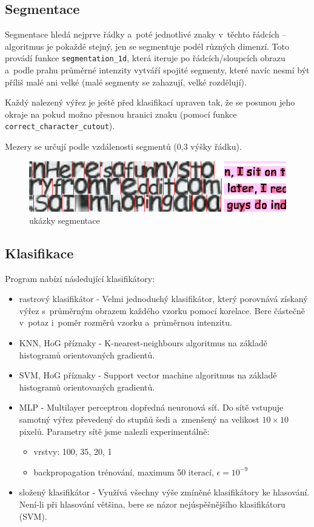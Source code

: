 \documentclass[12pt]{article}
\begin{document}
\subsection{Segmentace}

Segmentace hledá nejprve řádky a~poté jednotlivé znaky v~těchto řádcích -- algoritmus je pokaždé stejný, jen
se segmentuje podél různých dimenzí. Toto provádí funkce {\tt segmentation\_1d}, která iteruje po
řádcích/sloupcích obrazu a~podle prahu průměrné intenzity vytváří spojité segmenty, které navíc nesmí být příliš malé
ani velké (malé segmenty se zahazují, velké rozdělují).

Každý nalezený výřez je ještě před klasifikací upraven tak, že se posunou jeho okraje na pokud možno přesnou hranici znaku
(pomocí funkce {\tt correct\_character\_cutout}).

Mezery se určují podle vzdálenosti segmentů (0,3 výšky řádku).

\begin{figure}[htb]
  \centering
  \includegraphics[width=13.5cm,keepaspectratio]{cutouts.png}
  \caption{ukázky segmentace}
\end{figure}

\subsection{Klasifikace}

Program nabízí následující klasifikátory:

\begin{itemize}
  \item rastrový klasifikátor \cite{ocr} - Velmi jednoduchý klasifikátor, který porovnává získaný výřez s~průměrným obrazem každého vzorku pomocí korelace. Bere částečně v~potaz i~poměr rozměrů vzorku a~průměrnou intenzitu.
  \item KNN, HoG příznaky - K-nearest-neighbours algoritmus na základě histogramů orientovaných gradientů.
  \item SVM, HoG příznaky - Support vector machine algoritmus na základě histogramů orientovaných gradientů.
  \item MLP - Multilayer perceptron dopředná neuronová síť. Do sítě vstupuje samotný výřez převedený do stupňů šedi a~zmenšený na velikost $10 \times 10$ pixelů. Parametry sítě jsme nalezli experimentálně: 
    \begin{itemize}
      \item vrstvy: 100, 35, 20, 1
      \item backpropagation trénování, maximum 50 iterací, $\epsilon = 10^{-9}$
    \end{itemize}
  \item složený klasifikátor - Využívá všechny výše zmíněné klasifikátory ke hlasování. Není-li při hlasování většina, bere se názor nejúspěšnějšího klasifikátoru (SVM).
\end{itemize}
\end{document}
